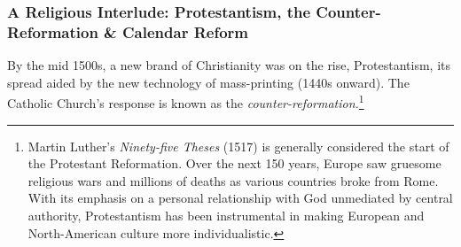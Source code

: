 








\subsubsection*{A Religious Interlude: Protestantism, the Counter-Reformation \& Calendar Reform}

By the mid 1500s, a new brand of Christianity was on the rise, Protestantism, its spread aided by the new technology of mass-printing (1440s onward). The Catholic Church's response is known as the \emph{counter-reformation.}\footnote{%
	Martin Luther's \emph{Ninety-five Theses} (1517) is generally considered the start of the Protestant Reformation. Over the next 150 years, Europe saw gruesome religious wars and millions of deaths as various countries broke from Rome. With its emphasis on a personal relationship with God unmediated by central authority, Protestantism has been instrumental in making European and North-American culture more individualistic.%
}

